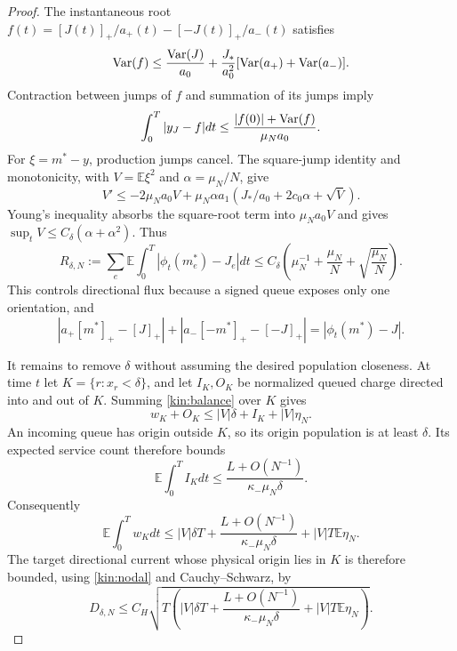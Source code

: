 \documentclass[11pt]{article}
\theoremstyle{definition}\newtheorem{definition}[theorem]{Definition}
\theoremstyle{remark}\newtheorem{remark}[theorem]{Remark}
\begin{document}
\begin{proof}
The instantaneous root
$f(t)=[J(t)]_+/a_+(t)-[-J(t)]_+/a_-(t)$ satisfies
\[
 \operatorname{Var}(f)\le \frac{\operatorname{Var}(J)}{a_0}
 +\frac{J_*}{a_0^2}[\operatorname{Var}(a_+)+\operatorname{Var}(a_-)].
\]
Contraction between jumps of $f$ and summation of its jumps imply
\[
 \int_0^T|y_J-f|dt\le\frac{|f(0)|+\operatorname{Var}(f)}{\mu_Na_0}.
\]
For $\xi=m^*-y$, production jumps cancel. The square-jump identity and
monotonicity, with $V=\mathbb E\xi^2$ and $\alpha=\mu_N/N$, give
\[
 V'\le-2\mu_Na_0V+
 \mu_N\alpha a_1(J_*/a_0+2c_0\alpha+\sqrt V).
\]
Young's inequality absorbs the square-root term into $\mu_Na_0V$ and
gives $\sup_tV\le C_\delta(\alpha+\alpha^2)$. Thus
\begin{equation}
 R_{\delta,N}:=\sum_e\mathbb E\int_0^T|\phi_t(m_e^*)-J_e|dt
 \le C_\delta\left(\mu_N^{-1}+\frac{\mu_N}{N}
 +\sqrt{\frac{\mu_N}{N}}\right).
 \label{kin:R}
\end{equation}
This controls directional flux because a signed queue exposes only one
orientation, and
\[
 |a_+[m^*]_+-[J]_+|+|a_-[-m^*]_+-[-J]_+|
 =|\phi_t(m^*)-J|.
\]

It remains to remove $\delta$ without assuming the desired population
closeness. At time $t$ let $K=\{r:x_r<\delta\}$, and let $I_K,O_K$ be
normalized queued charge directed into and out of $K$. Summing
\eqref{kin:balance} over $K$ gives
\[
 w_K+O_K\le |V|\delta+I_K+|V|\eta_N.
\]
An incoming queue has origin outside $K$, so its origin population is at
least $\delta$. Its expected service count therefore bounds
\[
 \mathbb E\int_0^TI_Kdt\le
 \frac{L+O(N^{-1})}{\kappa_-\mu_N\delta}.
\]
Consequently
\begin{equation}
 \mathbb E\int_0^Tw_Kdt\le |V|\delta T+
 \frac{L+O(N^{-1})}{\kappa_-\mu_N\delta}+|V|T\mathbb E\eta_N.
 \label{kin:smallmass}
\end{equation}
The target directional current whose physical origin lies in $K$ is
therefore bounded, using \eqref{kin:nodal} and Cauchy--Schwarz, by
\begin{equation}
 D_{\delta,N}\le C_H\sqrt{T\left(|V|\delta T+
 \frac{L+O(N^{-1})}{\kappa_-\mu_N\delta}+|V|T\mathbb E\eta_N\right)}.
 \label{kin:smallflux}
\end{equation}


\end{proof}
\end{document}
